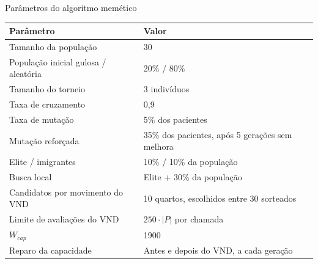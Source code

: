 \documentclass[aspectratio=169,10pt]{beamer}
\newcommand{\framerefs}{}
\newcommand{\slidecites}[1]{\gdef\framerefs{Referências: \cite{#1}}}
\gdef\framerefs{}%
\begin{document}
\begin{frame}{Parâmetros do algoritmo memético}
    \slidecites{talbi2009metaheuristics}
    \centering
    \footnotesize
    \begin{tabular}{ll}
        \toprule
        \textbf{Parâmetro} & \textbf{Valor} \\
        \midrule
        Tamanho da população & 30 \\
        População inicial gulosa / aleatória & 20\% / 80\% \\
        Tamanho do torneio & 3 indivíduos \\
        Taxa de cruzamento & 0,9 \\
        Taxa de mutação & 5\% dos pacientes \\
        Mutação reforçada & 35\% dos pacientes, após 5 gerações sem melhora \\
        Elite / imigrantes & 10\% / 10\% da população \\
        Busca local & Elite + 30\% da população \\
        Candidatos por movimento do VND & 10 quartos, escolhidos entre 30 sorteados \\
        Limite de avaliações do VND & $250 \cdot |P|$ por chamada \\
        $W_{cap}$ & 1900 \\
        Reparo da capacidade & Antes e depois do VND, a cada geração \\
        \bottomrule
    \end{tabular}
\end{frame}
\end{document}

